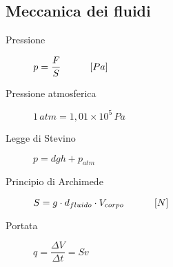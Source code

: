 \documentclass[a4paper,11pt,italian]{article}
\begin{document}
\subsection{Meccanica dei fluidi}

\begin{description}
  \item[Pressione] 
$ p = \dfrac{F}{S} \hspace*{3em} [Pa]$
  
  \item[Pressione atmosferica]
  $ 1 \, atm = 1,01 \times 10^5 \, Pa $
  
  
  \item[Legge di Stevino]
  $ p = dgh + p_{atm} $
  
  \item[Principio di Archimede] 
  $ S = g \cdot d_{fluido} \cdot V_{corpo} \hspace*{3em} \left[ N \right] $
  
  
  \item[Portata]
  $ q = \dfrac{\Delta V}{\Delta t} = Sv $


\end{description}
\end{document}
